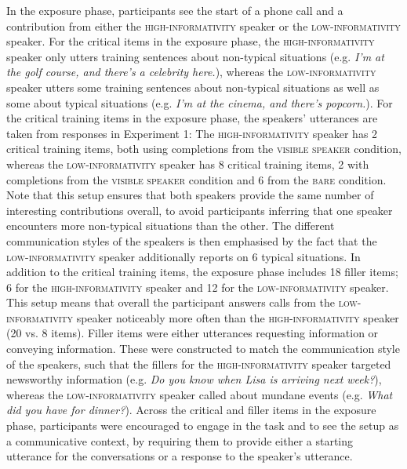 \documentclass[output=paper,colorlinks,citecolor=brown]{langscibook}
\begin{document}
In the exposure phase, participants see the start of a phone call and a contribution from either the \textsc{high-informativity} speaker or the \textsc{low-informativity} speaker. For the critical items in the exposure phase, the \textsc{high-informativity} speaker only utters training sentences about non-typical situations (e.g. \textit{I’m at the golf course, and there’s a celebrity here.}), whereas the \textsc{low-informativity} speaker utters some training sentences about non-typical situations as well as some about typical situations (e.g. \textit{I’m at the cinema, and there’s popcorn.}). For the critical training items in the exposure phase, the speakers’ utterances are taken from responses in Experiment 1: The \textsc{high-informativity} speaker has 2 critical training items, both using completions from the \textsc{visible speaker} condition, whereas the \textsc{low-informativity} speaker has 8 critical training items, 2 with completions from the \textsc{visible speaker} condition and 6 from the \textsc{bare} condition. Note that this setup ensures that both speakers provide the same number of interesting contributions overall, to avoid participants inferring that one speaker encounters more non-typical situations than the other. The different communication styles of the speakers is then emphasised by the fact that the \textsc{low-informativity} speaker additionally reports on 6 typical situations. In addition to the critical training items, the exposure phase includes 18 filler items; 6 for the \textsc{high-informativity} speaker and 12 for the \textsc{low-informativity} speaker. This setup means that overall the participant answers calls from the \textsc{low-informativity} speaker noticeably more often than the \textsc{high-informativity} speaker (20 vs. 8 items). Filler items were either utterances requesting information or conveying information. These were constructed to match the communication style of the speakers, such that the fillers for the \textsc{high-informativity} speaker targeted newsworthy information (e.g. \textit{Do you know when Lisa is arriving next week?}), whereas the \textsc{low-informativity} speaker called about mundane events (e.g. \textit{What did you have for dinner?}). Across the critical and filler items in the exposure phase, participants were encouraged to engage in the task and to see the setup as a communicative context, by requiring them to provide either a starting utterance for the conversations or a response to the speaker’s utterance.
 
\end{document}

